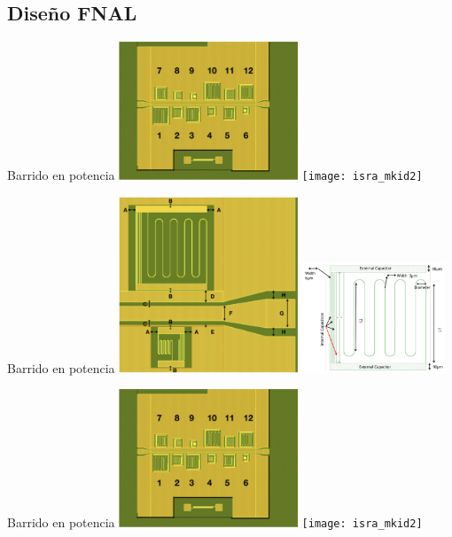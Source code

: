 \documentclass[ignorenonframetext,12pt]{beamer}
\begin{document}
\subsection{Diseño FNAL}%
\begin{frame}{Barrido en potencia}
				\centering
												\includegraphics[width=0.4\textwidth]{isra_mkid1}
												\texttt{[image: isra\_mkid2]}
\end{frame}
\begin{frame}{Barrido en potencia}
				\centering
												\includegraphics[width=0.4\textwidth]{isra_mkid3}
												\includegraphics[width=0.32\textwidth]{isra_mkid4}
\end{frame}
\begin{frame}{Barrido en potencia}
				\centering
												\includegraphics[width=0.4\textwidth]{isra_mkid1}
												\texttt{[image: isra\_mkid2]}
\end{frame}
\end{document}
